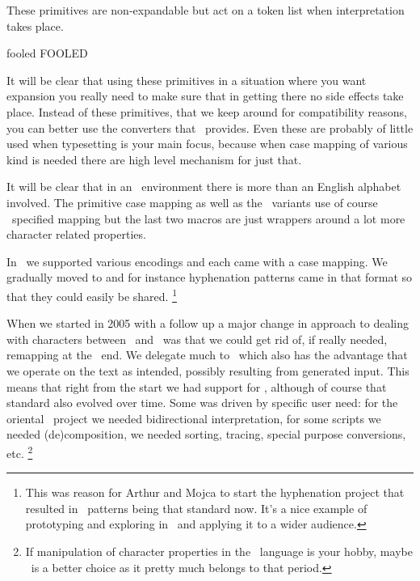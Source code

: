 \typebuffer[option=TEX]

\startlines
\getbuffer
\stoplines

These primitives are non-expandable but act on a token list when interpretation
takes place.

\startbuffer
\begingroup
    \lowercase{\edefcsname fooled}
    \meaningfull\fooled
    \meaningfull\FOOLED
\endgroup
\begingroup
    \uppercase{\edefcsname fooled}
    \meaningfull\fooled
    \meaningfull\FOOLED
\endgroup
\stopbuffer

\typebuffer[option=TEX]

\startlines
\getbuffer
\stoplines

It will be clear that using these primitives in a situation where you want
expansion you really need to make sure that in getting there no side effects take
place. Instead of these primitives, that we keep around for compatibility
reasons, you can better use the converters that \CONTEXT\ provides. Even these
are probably of little used when typesetting is your main focus, because when
case mapping of various kind is needed there are high level mechanism for just
that.

\startbuffer
\edef\fooled{}\meaning\fooled
\edef\fooled{}\meaning\fooled
\stopbuffer

\typebuffer[option=TEX]

\startlines
\getbuffer
\stoplines

It will be clear that in an \UNICODE\ environment there is more than an English
alphabet involved. The primitive case mapping as well as the \CONTEXT\ variants
use of course \UNICODE\ specified mapping but the last two macros are just
wrappers around a lot more character related properties.

In \MKII\ we supported various encodings and each came with a case mapping. We
gradually moved to  and for instance hyphenation patterns came in that
format so that they could easily be shared. \footnote {This was reason for Arthur
and Mojca to start the hyphenation project that resulted in \UTF\ patterns being
that standard now. It's a nice example of prototyping and exploring in \CONTEXT\
and applying it to a wider audience.}

When we started in 2005 with a follow up a major change in approach to dealing
with characters between \MKII\ and \MKIV\ was that we could get rid of, if really
needed, remapping at the \TEX\ end. We delegate much to \LUA\ which also has the
advantage that we operate on the text as intended, possibly resulting from
generated input. This means that right from the start we had support for
\UNICODE, although of course that standard also evolved over time. Some was
driven by specific user need: for the oriental \TEX\ project we needed
bidirectional interpretation, for some scripts we needed (de)composition, we
needed sorting, tracing, special purpose conversions, etc. \footnote {If
manipulation of character properties in the \TEX\ language is your hobby, maybe
\MKII\ is a better choice as it pretty much belongs to that period.}

